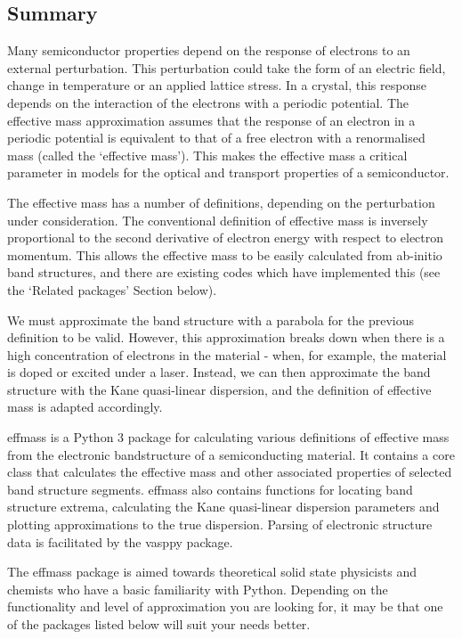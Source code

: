 

\subsection*{Summary}
\label{sec:summary}

Many semiconductor properties depend on the response of electrons to an external perturbation. This perturbation could take the form of an electric field, change in temperature or an applied lattice stress. In a crystal, this response depends on the interaction of the electrons with a periodic potential. The effective mass approximation assumes that the response of an electron in a periodic potential is equivalent to that of a free electron with a renormalised mass (called the `effective mass'). This makes the effective mass a critical parameter in models for the optical and transport properties of a semiconductor.

The effective mass has a number of definitions, depending on the perturbation under consideration. The conventional definition of effective mass is inversely proportional to the second derivative of electron energy with respect to electron momentum.\autocite[p.~227]{Ashcroft1976} This allows the effective mass to be easily calculated from ab-initio band structures, and there are existing codes which have implemented this (see the `Related packages' Section below).

We must approximate the band structure with a parabola for the previous definition to be valid.\autocite{Ariel2012} However, this approximation breaks down when there is a high concentration of electrons in the material - when, for example, the material is doped or excited under a laser. Instead, we can then approximate the band structure with the Kane quasi-linear dispersion,\autocite{Kane1957} and the definition of effective mass is adapted accordingly.

effmass\autocite{Whalley2018b} is a Python 3 package for calculating various definitions of effective mass from the electronic bandstructure of a semiconducting material. It contains a core class that calculates the effective mass and other associated properties of selected band structure segments. effmass also contains functions for locating band structure extrema, calculating the Kane quasi-linear dispersion parameters and plotting approximations to the true dispersion. Parsing of electronic structure data is facilitated by the vasppy package.\autocite{Morgan2018}

The effmass package is aimed towards theoretical solid state physicists and chemists who have a basic familiarity with Python. Depending on the functionality and level of approximation you are looking for, it may be that one of the packages listed below will suit your needs better.

